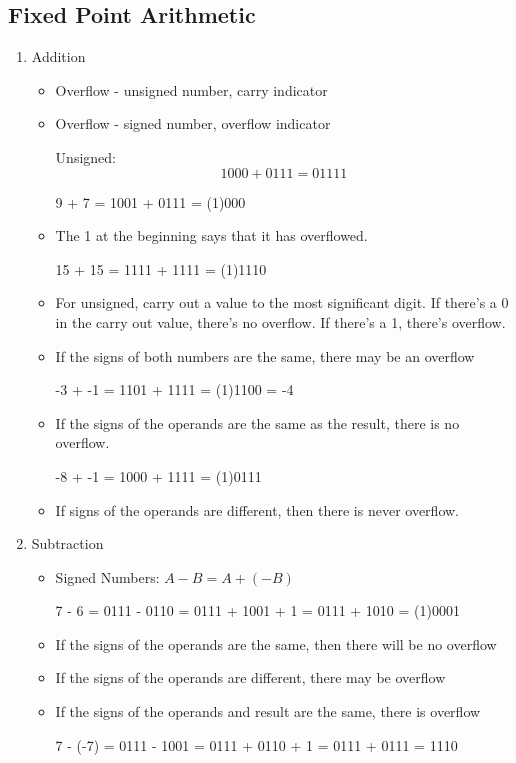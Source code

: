 \documentclass[12pt]{article}
\begin{document}
\subsection{Fixed Point Arithmetic}
\begin{enumerate} 
\item Addition \begin{itemize} 
\item Overflow - unsigned number, carry indicator 
\item Overflow - signed number, overflow indicator 
 \begin{example} Unsigned: $$ 1000 + 0111 = 01111 $$ \end{example}
  \begin{example} 9 + 7 = 1001 + 0111 = (1)000 \end{example}
\item  The 1 at the beginning says that it has overflowed.  
 \begin{example} 15 + 15 = 1111 + 1111 = (1)1110 \end{example} 
\item For unsigned, carry out a value to the most significant digit. If there's a 0 in the carry out value, there's no overflow. If there's a 1, there's overflow. 
\item If the signs of both numbers are the same, there may be an overflow 
\begin{example} -3 + -1 = 1101 + 1111 = (1)1100 = -4 \end{example}
\item If the signs of the operands are the same as the result, there is no overflow. 
 \begin{example} -8 + -1 = 1000 + 1111 = (1)0111 \end{example}
\item If signs of the operands are different, then there is never overflow. 
\end{itemize}
\item Subtraction \begin{itemize}
\item Signed Numbers: $A - B = A + (-B)$ 
\begin{example} 7 - 6 = 0111 - 0110 = 0111 + 1001 + 1 = 0111 + 1010 = (1)0001 \end{example} 
\item If the signs of the operands are the same, then there will be no overflow 
\item If the signs of the operands are different, there may be overflow 
\item If the signs of the operands and result are the same, there is overflow 
\begin{example} 7 - (-7) = 0111 - 1001 = 0111 + 0110 + 1 = 0111 + 0111 = 1110 \end{example}
\end{itemize}
 \end{enumerate} 
 
\end{document}
